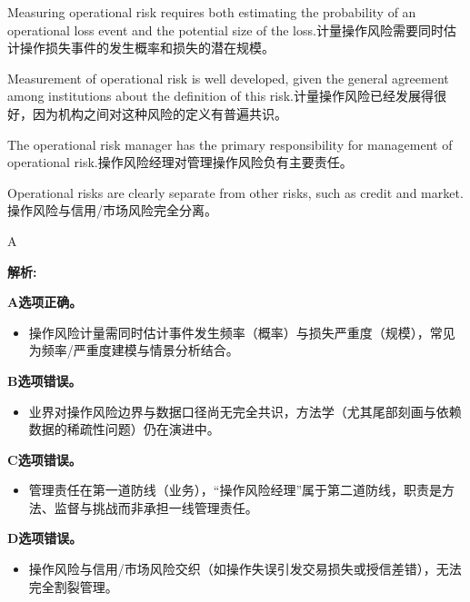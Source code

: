\documentclass{article}
\newenvironment{explanation}
{\textbf{解析:}\par}
{\par}
\begin{document}
\begin{choices}
    \item Measuring operational risk requires both estimating the probability of an operational loss event and the potential size of the loss.计量操作风险需要同时估计操作损失事件的发生概率和损失的潜在规模。
    \item Measurement of operational risk is well developed, given the general agreement among institutions about the definition of this risk.计量操作风险已经发展得很好，因为机构之间对这种风险的定义有普遍共识。
    \item The operational risk manager has the primary responsibility for management of operational risk.操作风险经理对管理操作风险负有主要责任。
    \item Operational risks are clearly separate from other risks, such as credit and market.操作风险与信用/市场风险完全分离。
\end{choices}

\begin{correctanswer}
    A
\end{correctanswer}

\begin{explanation}
    \textbf{A选项正确。}
    \begin{itemize}
        \item 操作风险计量需同时估计事件发生频率（概率）与损失严重度（规模），常见为频率/严重度建模与情景分析结合。
    \end{itemize}

    \textbf{B选项错误。}
    \begin{itemize}
        \item 业界对操作风险边界与数据口径尚无完全共识，方法学（尤其尾部刻画与依赖数据的稀疏性问题）仍在演进中。
    \end{itemize}

    \textbf{C选项错误。}
    \begin{itemize}
        \item 管理责任在第一道防线（业务），“操作风险经理”属于第二道防线，职责是方法、监督与挑战而非承担一线管理责任。
    \end{itemize}

    \textbf{D选项错误。}
    \begin{itemize}
        \item 操作风险与信用/市场风险交织（如操作失误引发交易损失或授信差错），无法完全割裂管理。
    \end{itemize}
\end{explanation}
\end{document}
